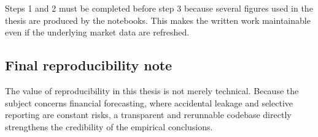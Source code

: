 Steps 1 and 2 must be completed before step 3 because several figures used in the thesis are produced by the notebooks. This makes the written work maintainable even if the underlying market data are refreshed.

\subsection{Final reproducibility note}

The value of reproducibility in this thesis is not merely technical. Because the subject concerns financial forecasting, where accidental leakage and selective reporting are constant risks, a transparent and rerunnable codebase directly strengthens the credibility of the empirical conclusions.
